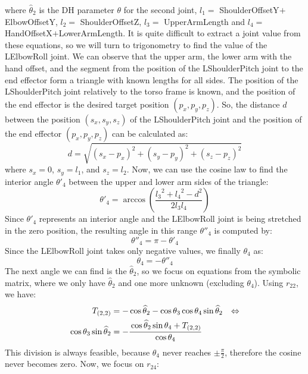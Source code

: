 where $\widehat{\theta}_2$ is the DH parameter $\theta$ for the second joint, $l_1 =$ ShoulderOffsetY$+$ElbowOffsetY, $l_2 =$ ShoulderOffsetZ, $l_3 =$ UpperArmLength and $l_4 =$ HandOffsetX$+$LowerArmLength.
It is quite difficult to extract a joint value from these equations, so we will turn to trigonometry to find the value of the LElbowRoll joint. We can observe that the upper arm, the lower arm with the hand offset, and the segment from the position of the LShoulderPitch joint to the end effector form a triangle with known lengths for all sides. The position of the LShoulderPitch joint relatively to the torso frame is known, and the position of the end effector is the desired target position $(p_x,p_y,p_z)$. So, the distance $d$ between the position $(s_x,s_y,s_z)$ of the LShoulderPitch joint and the position of the end effector $(p_x,p_y,p_z)$ can be calculated as:
\[
d=\sqrt{\left(s_x-p_x\right)^2 + \left(s_y-p_y\right)^2 + \left(s_z-p_z\right)^2}
\]
where $s_x = 0$, $s_y = l_1$, and $s_z = l_2$.
Now, we can use the cosine law to find the interior angle $\theta'_4$ between the upper and lower arm sides of the triangle:
\[
\theta'_4 = \arccos\left(\frac{{l_3}^2 + {l_4}^2 - d^2}{2l_3l_4}\right)
\]
Since $\theta'_4$ represents an interior angle and the LElbowRoll joint is being stretched in the zero position, the resulting angle in this range $\theta''_4$ is computed by:
\[
\theta''_4 = \pi - \theta'_4
\]
Since the LElbowRoll joint takes only negative values, we finally $\theta_4$ as:
\[
\theta_4 = - \theta''_4
\]
The next angle we can find is the $\widehat{\theta}_2$, so we focus on equations from the symbolic matrix, where we only have $\widehat{\theta}_2$ and one more unknown (excluding $\theta_4$). Using $r_{22}$, we have:
\begin{align*}
T_{(2,2)} &= -\cos\widehat{\theta}_2 - \cos\theta_3\cos\theta_4\sin\widehat{\theta}_2 &\Leftrightarrow\\
\cos\theta_3\sin\widehat{\theta}_2 &= -\cfrac{\cos\widehat{\theta}_2\sin\theta_4 + T_{(2,2)}}{\cos\theta_4}
\end{align*}
This division is always feasible, because $\theta_4$ never reaches $\pm\frac{\pi}{2}$, therefore the cosine never becomes zero. Now, we focus on $r_{24}$:
